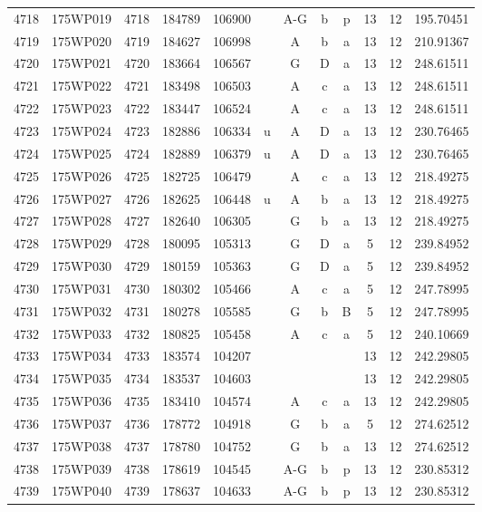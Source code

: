 \begin{tabular}{|*{12}{c|}}
4718 & 175WP019 & 4718 & 184789 & 106900 &  & A-G & b & p & 13 & 12 & 195.70451 \\ 
4719 & 175WP020 & 4719 & 184627 & 106998 &  & A & b & a & 13 & 12 & 210.91367 \\ 
4720 & 175WP021 & 4720 & 183664 & 106567 &  & G & D & a & 13 & 12 & 248.61511 \\ 
4721 & 175WP022 & 4721 & 183498 & 106503 &  & A & c & a & 13 & 12 & 248.61511 \\ 
4722 & 175WP023 & 4722 & 183447 & 106524 &  & A & c & a & 13 & 12 & 248.61511 \\ 
4723 & 175WP024 & 4723 & 182886 & 106334 & u & A & D & a & 13 & 12 & 230.76465 \\ 
4724 & 175WP025 & 4724 & 182889 & 106379 & u & A & D & a & 13 & 12 & 230.76465 \\ 
4725 & 175WP026 & 4725 & 182725 & 106479 &  & A & c & a & 13 & 12 & 218.49275 \\ 
4726 & 175WP027 & 4726 & 182625 & 106448 & u & A & b & a & 13 & 12 & 218.49275 \\ 
4727 & 175WP028 & 4727 & 182640 & 106305 &  & G & b & a & 13 & 12 & 218.49275 \\ 
4728 & 175WP029 & 4728 & 180095 & 105313 &  & G & D & a & 5 & 12 & 239.84952 \\ 
4729 & 175WP030 & 4729 & 180159 & 105363 &  & G & D & a & 5 & 12 & 239.84952 \\ 
4730 & 175WP031 & 4730 & 180302 & 105466 &  & A & c & a & 5 & 12 & 247.78995 \\ 
4731 & 175WP032 & 4731 & 180278 & 105585 &  & G & b & B & 5 & 12 & 247.78995 \\ 
4732 & 175WP033 & 4732 & 180825 & 105458 &  & A & c & a & 5 & 12 & 240.10669 \\ 
4733 & 175WP034 & 4733 & 183574 & 104207 &  &  &  &  & 13 & 12 & 242.29805 \\ 
4734 & 175WP035 & 4734 & 183537 & 104603 &  &  &  &  & 13 & 12 & 242.29805 \\ 
4735 & 175WP036 & 4735 & 183410 & 104574 &  & A & c & a & 13 & 12 & 242.29805 \\ 
4736 & 175WP037 & 4736 & 178772 & 104918 &  & G & b & a & 5 & 12 & 274.62512 \\ 
4737 & 175WP038 & 4737 & 178780 & 104752 &  & G & b & a & 13 & 12 & 274.62512 \\ 
4738 & 175WP039 & 4738 & 178619 & 104545 &  & A-G & b & p & 13 & 12 & 230.85312 \\ 
4739 & 175WP040 & 4739 & 178637 & 104633 &  & A-G & b & p & 13 & 12 & 230.85312 \\ 

\end{tabular}
